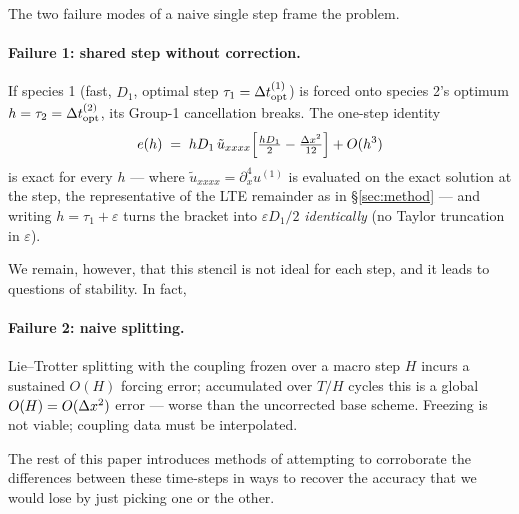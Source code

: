 The two failure modes of a naive single step frame the problem.

\paragraph{Failure 1: shared step without correction.} If species 1 (fast,
$D_1$, optimal step $\tau_1=\Delta t_{\mathrm{opt}}^{(1)}$) is forced onto species 2's optimum
$h=\tau_2=\Delta t_{\mathrm{opt}}^{(2)}$, its Group-1
cancellation breaks. The one-step identity
\begin{equation}\label{eq:mismatchid}
e(h) \;=\; h D_1\,\tilde u_{xxxx}
\Bigl[\tfrac{h D_1}{2} - \tfrac{\Delta x^2}{12}\Bigr] + O(h^3)
\end{equation}
is exact for every $h$ --- where $\tilde u_{xxxx}=\partial_x^4u^{(1)}$ is evaluated on the exact solution at the step, the representative of the LTE remainder as in \S\ref{sec:method} --- and writing $h = \tau_1 + \varepsilon$ turns
the bracket into $\varepsilon D_1/2$ \emph{identically} (no Taylor truncation in
$\varepsilon$). 

We remain, however, that this stencil is not ideal for each step, and it leads to questions of stability. In fact,

\paragraph{Failure 2: naive splitting.} Lie--Trotter splitting with the
coupling frozen over a macro step $H$ incurs a sustained $O(H)$ forcing error;
accumulated over $T/H$ cycles this is a global $O(H) = O(\Delta x^2)$ error ---
worse than the uncorrected base scheme. Freezing is not viable; coupling
data must be interpolated. 

The rest of this paper introduces methods of attempting to corroborate the differences between these time-steps in ways to recover the accuracy that we would lose by just picking one or the other. 
